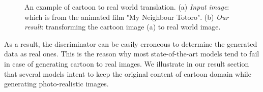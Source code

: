 \documentclass[runningheads]{llncs}
\begin{document}
\begin{figure}
\centering     %
{}
\caption{An example of cartoon to real world translation. (a) \textit{Input image}: which is from the animated film "My Neighbour Totoro". (b) \textit{Our result}: transforming the cartoon image (a) to real world image.}
\label{fig:intro}
\end{figure}

As
a result,
the discriminator can be easily erroneous to determine the generated data as real ones.
This is the reason why most state-of-the-art models tend to fail in case of generating cartoon to real images.
We illustrate in our result section that several models intent to keep the original content of cartoon domain while generating photo-realistic images.
\end{document}
